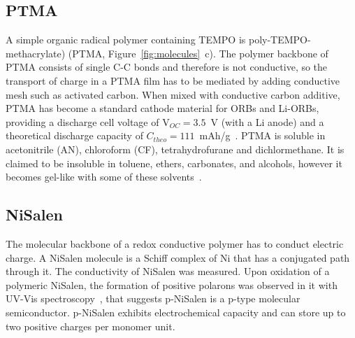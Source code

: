 \subsection{PTMA}
A simple organic radical polymer containing TEMPO is poly-TEMPO-methacrylate) (PTMA, Figure~\ref{fig:molecules}~c). The polymer backbone of PTMA consists of single C-C bonds and therefore is not conductive, so the transport of charge in a PTMA film has to be mediated by adding conductive mesh such as activated carbon. When mixed with conductive carbon additive, PTMA has become a standard cathode material for ORBs and Li-ORBs, providing a discharge cell voltage of V$_{OC}=3.5$~V (with a Li anode) and a theoretical discharge capacity of $C_{theo}=111$~mAh/g~\cite{Daniel2023_Multimodal}. PTMA is soluble in acetonitrile (AN), chloroform (CF), tetrahydrofurane and dichlormethane. It is claimed to be insoluble in toluene, ethers, carbonates, and alcohols, however it becomes gel-like with some of these solvents~\cite{DOM}.

\subsection{NiSalen}
The molecular backbone of a redox conductive polymer has to conduct electric charge. A NiSalen molecule is a Schiff complex of Ni that has a conjugated path through it. The conductivity of NiSalen was measured. Upon oxidation of a polymeric NiSalen, the formation of positive polarons was observed in it with UV-Vis spectroscopy~\cite{Dmitrieva2018}, that suggests p-NiSalen is a p-type molecular semiconductor. p-NiSalen exhibits electrochemical capacity and can store up to two positive charges per monomer unit.


